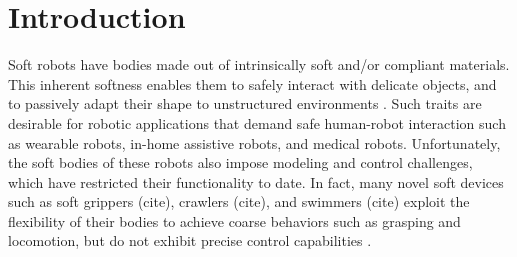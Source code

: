 \section{Introduction} 
\label{sec:intro}

Soft robots have bodies made out of intrinsically soft and/or compliant materials.
This inherent softness enables them to safely interact with delicate objects, and to passively adapt their shape to unstructured environments \cite{rus2015design}.
Such traits are desirable for robotic applications that demand safe human-robot interaction such as wearable robots, in-home assistive robots, and medical robots.
Unfortunately, the soft bodies of these robots also impose modeling and control challenges, which have restricted their functionality to date. 
In fact, many novel soft devices such as soft grippers (cite), crawlers (cite), and swimmers (cite) exploit the flexibility of their bodies to achieve coarse behaviors such as grasping and locomotion, but do not exhibit precise control capabilities .




